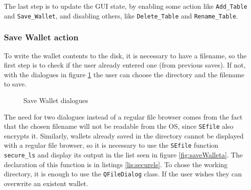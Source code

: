 The last step is to update the GUI state, by enabling some action like \texttt{Add\_Table} and \texttt{Save\_Wallet}, and disabling others, like \texttt{Delete\_Table} and \texttt{Rename\_Table}.

\subsubsection*{Save Wallet action} \label{sec:savewalletaction}
To write the wallet contents to the disk, it is necessary to have a filename, so the first step is to check if the user already entered one (from previous saves). If not, with the dialogues in figure \ref{fig:saveWallet} the user can choose the directory and the filename to save.

\begin{figure}[ht]
  \centering
  {}
  \caption{Save Wallet dialogues}
 \label{fig:saveWallet}
\end{figure}

The need for two dialogues instead of a regular file browser comes from the fact that the chosen filename will not be readable from the OS, since \texttt{SEfile} also encrypts it. Similarly, wallets already saved in the directory cannot be displayed with a regular file browser, so it is necessary to use the \texttt{SEfile} function \texttt{secure\_ls} and display its output in the list seen in figure \ref{fig:saveWalleta}. The declaration of this function is in listings \ref{lis:securels}. To chose the working directory, it is enough to use the \texttt{QFileDialog} class. If the user wishes they can overwrite an existent wallet.

